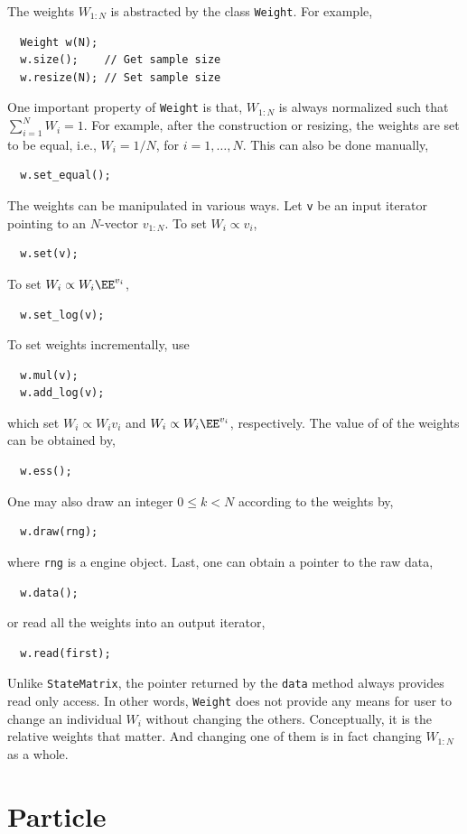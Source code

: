The weights $W_{1:N}$ is abstracted by the class \verb|Weight|. For example,
\begin{Verbatim}
  Weight w(N);
  w.size();    // Get sample size
  w.resize(N); // Set sample size
\end{Verbatim}
One important property of \verb|Weight| is that, $W_{1:N}$ is always
normalized such that $\sum_{i=1}^N W_i = 1$. For example, after the
construction or resizing, the weights are set to be equal, i.e., $W_i = 1 / N$,
for $i = 1,\dots,N$. This can also be done manually,
\begin{Verbatim}
  w.set_equal();
\end{Verbatim}
The weights can be manipulated in various ways. Let \verb|v| be an input
iterator pointing to an $N$-vector $v_{1:N}$. To set $W_i \propto v_i$,
\begin{Verbatim}
  w.set(v);
\end{Verbatim}
To set $ W_i \propto W_i\EE^{v_i}$,
\begin{Verbatim}
  w.set_log(v);
\end{Verbatim}
To set weights incrementally, use
\begin{Verbatim}
  w.mul(v);
  w.add_log(v);
\end{Verbatim}
which set $W_i \propto W_iv_i$ and $W_i \propto W_i \EE^{v_i}$, respectively.
The value of \ess of the weights can be obtained by,
\begin{Verbatim}
  w.ess();
\end{Verbatim}
One may also draw an integer $0 \le k < N$ according to the weights by,
\begin{Verbatim}
  w.draw(rng);
\end{Verbatim}
where \verb|rng| is a \rng engine object. Last, one can obtain a pointer to the
raw data,
\begin{Verbatim}
  w.data();
\end{Verbatim}
or read all the weights into an output iterator,
\begin{Verbatim}
  w.read(first);
\end{Verbatim}
Unlike \verb|StateMatrix|, the pointer returned by the \verb|data| method
always provides read only access. In other words, \verb|Weight| does not
provide any means for user to change an individual $W_i$ without changing the
others. Conceptually, it is the relative weights that matter. And changing one
of them is in fact changing $W_{1:N}$ as a whole.

\section{Particle}
\label{sec:Particle}

